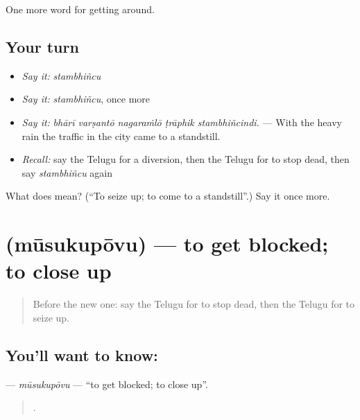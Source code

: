 \begin{grammarlens}[title={What you've built}]
One more word for getting around.
\end{grammarlens}

\subsection*{Your turn}
\begin{itemize}
\raggedright
  \item \emph{Say it:} \emph{stambhiñcu}
  \item \emph{Say it:} \emph{stambhiñcu}, once more
  \item \emph{Say it:} \emph{bhārī varṣantō nagaraṁlō ṭrāphik stambhiñcindi.} — With the heavy rain the traffic in the city came to a standstill.
  \item \emph{Recall:} say the Telugu for a diversion, then the Telugu for to stop dead, then say \emph{stambhiñcu} again
\end{itemize}

\begin{tcolorbox}[breakable,colback=teal!4,colframe=teal!35!black,title={Before you move on}]
What does  mean? (\textquotedblleft{}To seize up; to come to a standstill\textquotedblright{}.) Say it once more.
\end{tcolorbox}
\section[\texorpdfstring{\te{మూసుకుపోవు} (mūsukupōvu)}{మూసుకుపోవు (mūsukupōvu)}]{ (mūsukupōvu) — to get blocked; to close up}

\label{lesson:TE-C449-musukupovu}



\begin{quote}
Before the new one: say the Telugu for to stop dead, then the Telugu for to seize up.
\end{quote}

\subsection*{You'll want to know: }
\textbf{} — \emph{mūsukupōvu} — \textquotedblleft{}to get blocked; to close up\textquotedblright{}.

\begin{quote}
   .
\end{quote}

